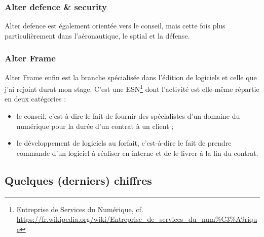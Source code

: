   \subsubsection{Alter defence \& security}
  Alter defence est également orientée vers le conseil, mais cette fois plus particulièrement dans l'aéronautique, le sptial et la défense.
  
  \subsubsection{Alter Frame}
  Alter Frame enfin est la branche spécialisée dans l'édition de logiciels et celle que j'ai rejoint durat mon stage. C'est une ESN\footnote{Entreprise de Services du Numérique, cf. \url{https://fr.wikipedia.org/wiki/Entreprise_de_services_du_num\%C3\%A9rique}} dont l'activité est elle-même répartie en deux catégories :
\begin{itemize}[label=$\bullet$]
    \item le conseil, c'est-à-dire le fait de fournir des spécialistes d'un domaine du numérique pour la durée d'un contrat à un client ;
    \item le développement de logiciels au forfait, c'est-à-dire le fait de prendre commande d'un logiciel à réaliser en interne et de le livrer à la fin du contrat.
    \end{itemize}

\subsection{Quelques (derniers) chiffres}

